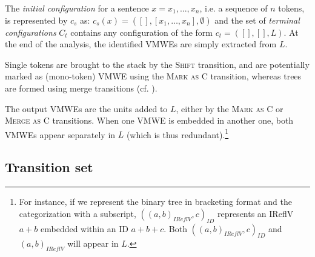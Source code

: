 \documentclass[output=paper,modfonts]{langscibook}
\begin{document}
The \emph{initial configuration} for a sentence $x = x_1, ..., x_n$, i.e. a sequence of $n$ tokens, is represented by $c_s$ as: $c_s (x) = ([], [x_1, \ldots, x_n], \emptyset)$ and the set of \emph{terminal configurations} $C_t$ contains any configuration of the form $c_t = ([], [], L)$. At the end of the analysis, the identified VMWEs are simply extracted from $L$.

Single tokens are brought to the stack by the \textsc{Shift} transition, and are potentially marked as (mono-token) VMWE using the \textsc{Mark as C} transition, whereas trees are formed using merge transitions (cf.  ).

The output VMWEs are the units added to $L$, either by the \textsc{Mark as C} or \textsc{Merge as C} transitions. When one VMWE is embedded in another one, both VMWEs appear separately in $L$ (which is thus redundant).\footnote{For instance, if we represent the binary tree in bracketing format and the categorization with a subscript, $( (a, b)_{IReflV}, c )_{ID}$ represents an IReflV $a+b$ embedded within an ID $a+b+c$. Both $( (a, b)_{IReflV}, c )_{ID}$ and $(a, b)_{IReflV}$ will appear in $L$.}

\subsection{Transition set} 
\label{sec:transitionset}
\end{document}
